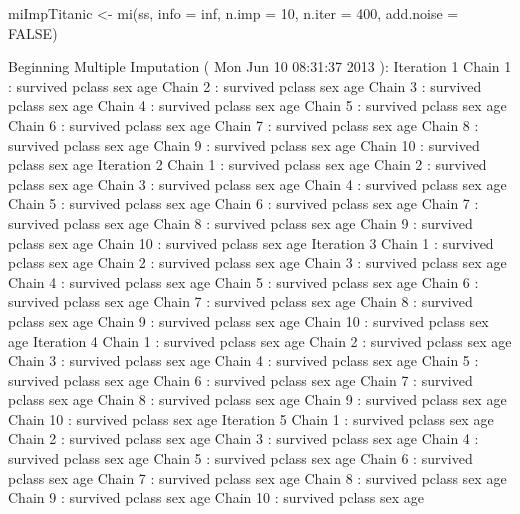 \begin{Schunk}
\begin{Sinput}
 miImpTitanic <- mi(ss, info = inf, n.imp = 10,  n.iter = 400, add.noise = FALSE)
\end{Sinput}
\begin{Soutput}
Beginning Multiple Imputation ( Mon Jun 10 08:31:37 2013 ):
Iteration 1 
 Chain 1 : survived   pclass   sex   age   
 Chain 2 : survived   pclass   sex   age   
 Chain 3 : survived   pclass   sex   age   
 Chain 4 : survived   pclass   sex   age   
 Chain 5 : survived   pclass   sex   age   
 Chain 6 : survived   pclass   sex   age   
 Chain 7 : survived   pclass   sex   age   
 Chain 8 : survived   pclass   sex   age   
 Chain 9 : survived   pclass   sex   age   
 Chain 10 : survived   pclass   sex   age   
Iteration 2 
 Chain 1 : survived   pclass   sex   age   
 Chain 2 : survived   pclass   sex   age   
 Chain 3 : survived   pclass   sex   age   
 Chain 4 : survived   pclass   sex   age   
 Chain 5 : survived   pclass   sex   age   
 Chain 6 : survived   pclass   sex   age   
 Chain 7 : survived   pclass   sex   age   
 Chain 8 : survived   pclass   sex   age   
 Chain 9 : survived   pclass   sex   age   
 Chain 10 : survived   pclass   sex   age   
Iteration 3 
 Chain 1 : survived   pclass   sex   age   
 Chain 2 : survived   pclass   sex   age   
 Chain 3 : survived   pclass   sex   age   
 Chain 4 : survived   pclass   sex   age   
 Chain 5 : survived   pclass   sex   age   
 Chain 6 : survived   pclass   sex   age   
 Chain 7 : survived   pclass   sex   age   
 Chain 8 : survived   pclass   sex   age   
 Chain 9 : survived   pclass   sex   age   
 Chain 10 : survived   pclass   sex   age   
Iteration 4 
 Chain 1 : survived   pclass   sex   age   
 Chain 2 : survived   pclass   sex   age   
 Chain 3 : survived   pclass   sex   age   
 Chain 4 : survived   pclass   sex   age   
 Chain 5 : survived   pclass   sex   age   
 Chain 6 : survived   pclass   sex   age   
 Chain 7 : survived   pclass   sex   age   
 Chain 8 : survived   pclass   sex   age   
 Chain 9 : survived   pclass   sex   age   
 Chain 10 : survived   pclass   sex   age   
Iteration 5 
 Chain 1 : survived   pclass   sex   age   
 Chain 2 : survived   pclass   sex   age   
 Chain 3 : survived   pclass   sex   age   
 Chain 4 : survived   pclass   sex   age   
 Chain 5 : survived   pclass   sex   age   
 Chain 6 : survived   pclass   sex   age   
 Chain 7 : survived   pclass   sex   age   
 Chain 8 : survived   pclass   sex   age   
 Chain 9 : survived   pclass   sex   age   
 Chain 10 : survived   pclass   sex   age   

\end{Soutput}
\end{Schunk}
